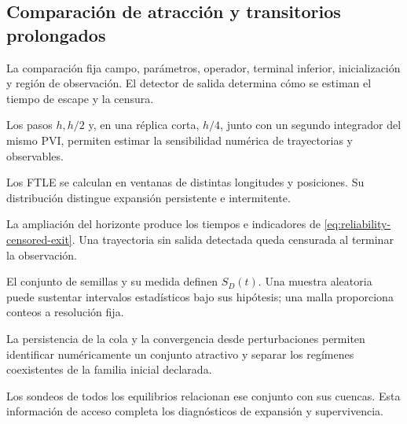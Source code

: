 \subsection{Comparación de atracción y transitorios prolongados}
\label{subsec:protocolo-transitorios}

\begin{description}[style=nextline,leftmargin=3.4em,labelwidth=2.9em]
 \item[Problema dinámico] La comparación fija campo, parámetros, operador,
 terminal inferior, inicialización y región de observación. El detector de
 salida determina cómo se estiman el tiempo de escape y la censura.
 \item[Discretización] Los pasos \(h,h/2\) y, en una réplica corta,
 \(h/4\), junto con un segundo integrador del mismo PVI, permiten estimar
 la sensibilidad numérica de trayectorias y observables.
 \item[Expansión] Los FTLE se calculan en ventanas de distintas longitudes
 y posiciones. Su distribución distingue expansión persistente e intermitente.
 \item[Escape] La ampliación del horizonte produce los tiempos e indicadores
 de \cref{eq:reliability-censored-exit}. Una trayectoria sin salida
 detectada queda censurada al terminar la observación.
 \item[Supervivencia] El conjunto de semillas y su medida definen
 \(S_D(t)\). Una muestra aleatoria puede sustentar intervalos estadísticos
 bajo sus hipótesis; una malla proporciona conteos a resolución fija.
 \item[Atracción] La persistencia de la cola y la convergencia desde
 perturbaciones permiten identificar numéricamente un conjunto atractivo y
 separar los regímenes coexistentes de la familia inicial declarada.
 \item[Acceso] Los sondeos de todos los equilibrios relacionan ese conjunto
 con sus cuencas. Esta información de acceso completa los diagnósticos de
 expansión y supervivencia.
\end{description}

